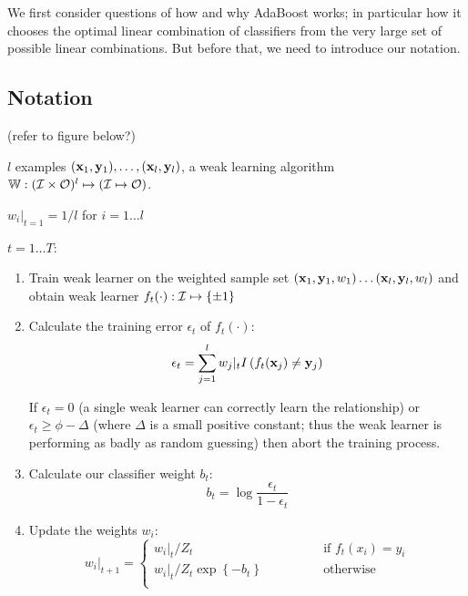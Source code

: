We first consider questions of how and why AdaBoost works; in
particular how it chooses the optimal linear combination of
classifiers from the very large set of possible linear combinations.
But before that, we need to introduce our notation.

\subsection{Notation}

(refer to figure below?)

\begin{linefigure}
\label{fig:boosting algorithm}
 $l$ examples $(\mathbf{x}_1, \mathbf{y}_1), \ldots, (\mathbf{x}_l,
\mathbf{y}_l)$, a weak learning algorithm $\mathbb{W} : (\mathcal{I} \times \mathcal{O})^l
\mapsto (\mathcal{I} \mapsto \mathcal{O})$.
\par
{} $w_i|_{t=1} = 1/l$ for $i=1 \ldots l$
\par
{} $t=1 \ldots T$:


\begin{enumerate}

\item	Train weak learner on the weighted sample set 
	$(\mathbf{x}_1, \mathbf{y}_1, w_1) \ldots (\mathbf{x}_l, \mathbf{y}_l, w_l)$
	and obtain weak learner $f_t(\cdot) : \mathcal{I} \mapsto \{\pm 1\}$

\item	Calculate the training error $\epsilon_t$ of $f_t(\cdot)$:
	\begin{equation}
	\epsilon_t = \sum_{j=1}^l w_j |_t 
	I \left( f_t(\mathbf{x}_j) \neq \mathbf{y}_j\right)
	\end{equation}

	If $\epsilon_t = 0$ (a single weak learner can correctly learn
	the relationship) or $\epsilon_t \geq \phi - \Delta$ (where
	$\Delta$ is a small positive constant; thus the weak
	learner is performing as badly as random guessing) then abort
	the training process.

\item	Calculate our classifier weight $b_t$:
	\begin{equation}
	b_t = \log \frac{\epsilon_t}{1 - \epsilon_t}
	\end{equation}

\item	Update the weights $w_i$:
	\begin{equation}
	w_i|_{t+1} = \left\{
	\begin{array}{cl}
		w_i|_t / Z_t	&	\qquad \qquad \mbox{if
		$f_t(x_i) = y_i$} \\
		w_i|_t / Z_t \exp \left\{ -b_t \right\} & \qquad \qquad
		\mbox{otherwise} \\
	\end{array} \right.
	\end{equation}


\end{enumerate}
\end{linefigure}
